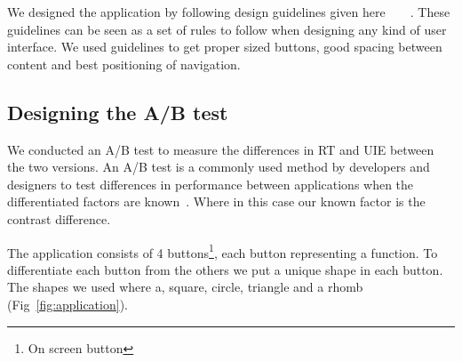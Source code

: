 \documentclass[runningheads,a4paper]{llncs}
\begin{document}
We designed the application by following design guidelines given here~\cite{hoober2011designing}~\cite{johnson2013designing}~\cite{gong2004guidelines}~\cite{norman2013design}. These guidelines can be seen as a set of rules to follow when designing any kind of user interface. We used guidelines to get proper sized buttons, good spacing between content and best positioning of navigation.

\subsection{Designing the A/B test}
We conducted an A/B test to measure the differences in RT and UIE between the two versions. An A/B test is a commonly used method by developers and designers to test differences in performance between applications when the differentiated factors are known~\cite{johnson2013designing}. Where in this case our known factor is the contrast difference. 

The application consists of 4 buttons\footnote{On screen button}, each button representing a function. To differentiate each button from the others we put a unique shape in each button. The shapes we used where a, square, circle, triangle and a rhomb (Fig~\ref{fig:application}).
\end{document}
